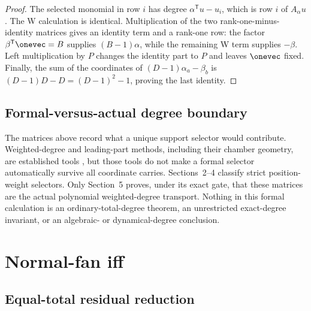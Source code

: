 \documentclass[11pt,letterpaper]{article}
\theoremstyle{definition}
\theoremstyle{remark}
\numberwithin{equation}{section}
\begin{document}
\begin{proof}
The selected monomial in row \(i\) has degree
\(\alpha^{\mathsf T}u-u_i\), which is row \(i\) of \(A_\alpha u\).
The W calculation is identical.  Multiplication of the two rank-one-minus-
identity matrices gives an identity term and a rank-one row:
the factor \(\beta^{\mathsf T}\onevec=B\) supplies \((B-1)\alpha\), while
the remaining W term supplies \(-\beta\).  Left multiplication by \(P\)
changes the identity part to \(P\) and leaves \(\onevec\) fixed.  Finally,
the sum of the coordinates of \((D-1)\alpha_a-\beta_b\) is
\((D-1)D-D=(D-1)^2-1\), proving the last identity.
\end{proof}

\subsection{Formal-versus-actual degree boundary}

The matrices above record what a unique support selector would contribute.
Weighted-degree and leading-part methods, including their chamber geometry,
are established tools \citep{BlancVanSanten2022,MeunierPreliminary,ShaoSun2025},
but those tools do not make a formal selector automatically survive all
coordinate carries.  Sections~2--4 classify strict position-weight
selectors.  Only Section~5 proves, under its exact gate, that these matrices
are the actual polynomial weighted-degree transport.  Nothing in this
formal calculation is an ordinary-total-degree theorem, an unrestricted
exact-degree invariant, or an algebraic- or dynamical-degree conclusion.

\section{Normal-fan iff}

\subsection{Equal-total residual reduction}
\end{document}
